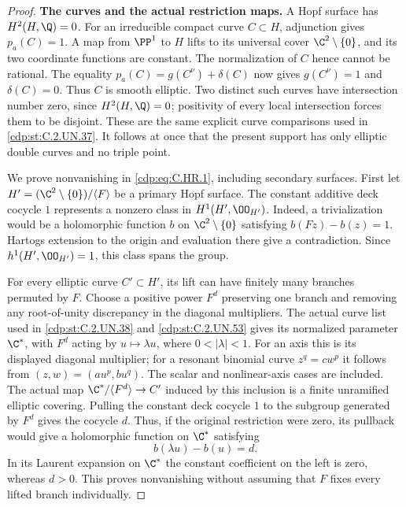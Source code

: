 \begin{proof}
\par\medskip\noindent\textbf{The curves and the actual restriction maps.}
A Hopf surface has $H^2(H,\Q)=0$. For an irreducible compact curve
$C\subset H$, adjunction gives $p_a(C)=1$. A map from $\PP^1$ to
$H$ lifts to its universal cover $\C^2\setminus\{0\}$, and its two
coordinate functions are constant. The normalization of $C$ hence
cannot be rational. The equality
$p_a(C)=g(C^\nu)+\delta(C)$ now gives $g(C^\nu)=1$ and
$\delta(C)=0$. Thus $C$ is smooth elliptic. Two distinct such
curves have intersection number zero, since $H^2(H,\Q)=0$;
positivity of every local intersection forces them to be disjoint.
These are the same explicit curve comparisons used in \ref{cdp:st:C.2.UN.37}.
It follows at once that the present support has only elliptic
double curves and no triple point.

We prove nonvanishing in \eqref{cdp:eq:C.HR.1}, including secondary surfaces.
First let $H'=(\C^2\setminus\{0\})/\langle F\rangle$ be a primary
Hopf surface. The constant additive deck cocycle $1$ represents a
nonzero class in $H^1(H',\OO_{H'})$. Indeed, a trivialization would
be a holomorphic function $b$ on $\C^2\setminus\{0\}$ satisfying
$b(Fz)-b(z)=1$. Hartogs extension to the origin and evaluation there
give a contradiction. Since $h^1(H',\OO_{H'})=1$, this class spans
the group.

For every elliptic curve $C'\subset H'$, its lift can have finitely
many branches permuted by $F$. Choose a positive power $F^d$
preserving one branch and removing any root-of-unity discrepancy
in the diagonal multipliers. The actual curve list used in
\ref{cdp:st:C.2.UN.38} and \ref{cdp:st:C.2.UN.53} gives its normalized parameter $\C^*$,
with $F^d$ acting by $u\mapsto\lambda u$, where
$0<|\lambda|<1$. For an axis this is its displayed diagonal
multiplier; for a resonant binomial curve $z^q=cw^p$ it follows
from $(z,w)=(a u^p,b u^q)$. The scalar and nonlinear-axis cases
are included. The actual map
$\C^*/\langle F^d\rangle\to C'$ induced by this inclusion is a
finite unramified elliptic covering. Pulling the constant deck
cocycle $1$ to the subgroup generated by $F^d$ gives the cocycle
$d$. Thus, if the original restriction were zero, its pullback
would give a holomorphic function on $\C^*$ satisfying
\[
                         b(\lambda u)-b(u)=d.          \tag{C.HR.4}\label{cdp:eq:C.HR.4}
\]
In its Laurent expansion on $\C^*$ the constant coefficient on
the left is zero, whereas $d>0$. This proves nonvanishing without
assuming that $F$ fixes every lifted branch individually.


\end{proof}
